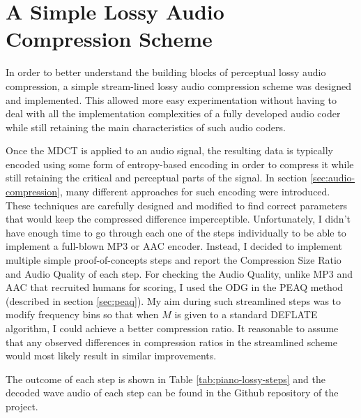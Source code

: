 \section{A Simple Lossy Audio Compression Scheme}
\label{sec:simple}

In order to better understand the building blocks of perceptual lossy audio compression, a simple stream-lined lossy audio compression scheme 
was designed and implemented. This allowed more easy experimentation without having to deal with all the implementation complexities of a fully developed audio coder while still retaining the main characteristics of such audio coders. 

Once the MDCT is applied to an audio signal, the resulting data is typically encoded using some form of entropy-based encoding in order to compress it while still retaining the critical and perceptual parts of the signal. In section \ref{sec:audio-compression}, many different approaches for such encoding were introduced. These techniques are carefully designed and modified to find correct parameters that would keep the compressed difference imperceptible. Unfortunately, I didn't have enough time to go through each one of the steps individually to be able to implement a full-blown MP3 or AAC encoder. Instead, I decided to implement  multiple simple proof-of-concepts steps and report the Compression Size Ratio and Audio Quality of each step. For checking the Audio Quality, unlike MP3 and AAC that recruited humans for scoring, I used the ODG in the PEAQ method (described in section \ref{sec:peaq}). My aim during such streamlined steps was to modify frequency bins so that when $M$ is given to a standard DEFLATE algorithm, I could achieve a better compression ratio. It reasonable to assume that any observed differences in compression ratios in the streamlined scheme would most likely result in similar improvements. 

The outcome of each step is shown in Table \ref{tab:piano-lossy-steps} and the decoded wave audio of each step can be found in the Github repository of the project\cite{github2022thesis}.


